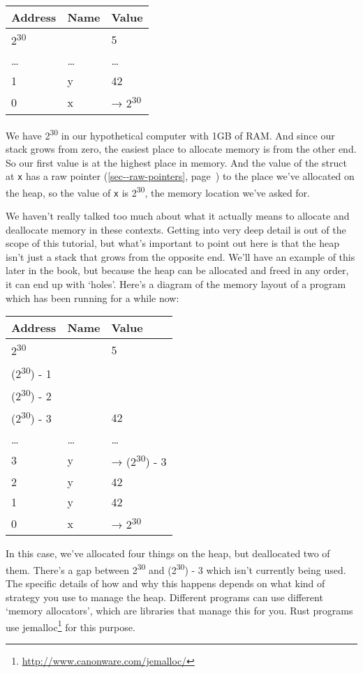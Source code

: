\documentclass[a4paper,]{book}
\renewcommand*{\hyperref}[2][\ar]{%
  \def\ar{#2}%
  #2 (\autoref{#1}, page~\pageref{#1})}
\renewcommand{\href}[2]{#2\footnote{\url{#1}}}
\begin{document}
\begin{longtable}[c]{@{}lll@{}}
\toprule
Address & Name & Value\tabularnewline
\midrule
\endhead
2\textsuperscript{30} & & 5\tabularnewline
\ldots{} & \ldots{} & \ldots{}\tabularnewline
1 & y & 42\tabularnewline
0 & x & → 2\textsuperscript{30}\tabularnewline
\bottomrule
\end{longtable}

We have 2\textsuperscript{30} in our hypothetical computer with 1GB of
RAM. And since our stack grows from zero, the easiest place to allocate
memory is from the other end. So our first value is at the highest place
in memory. And the value of the struct at \texttt{x} has a
\hyperref[sec--raw-pointers]{raw pointer} to the place we've allocated
on the heap, so the value of \texttt{x} is 2\textsuperscript{30}, the
memory location we've asked for.

We haven't really talked too much about what it actually means to
allocate and deallocate memory in these contexts. Getting into very deep
detail is out of the scope of this tutorial, but what's important to
point out here is that the heap isn't just a stack that grows from the
opposite end. We'll have an example of this later in the book, but
because the heap can be allocated and freed in any order, it can end up
with `holes'. Here's a diagram of the memory layout of a program which
has been running for a while now:

\begin{longtable}[c]{@{}lll@{}}
\toprule
Address & Name & Value\tabularnewline
\midrule
\endhead
2\textsuperscript{30} & & 5\tabularnewline
(2\textsuperscript{30}) - 1 & &\tabularnewline
(2\textsuperscript{30}) - 2 & &\tabularnewline
(2\textsuperscript{30}) - 3 & & 42\tabularnewline
\ldots{} & \ldots{} & \ldots{}\tabularnewline
3 & y & → (2\textsuperscript{30}) - 3\tabularnewline
2 & y & 42\tabularnewline
1 & y & 42\tabularnewline
0 & x & → 2\textsuperscript{30}\tabularnewline
\bottomrule
\end{longtable}

In this case, we've allocated four things on the heap, but deallocated
two of them. There's a gap between 2\textsuperscript{30} and
(2\textsuperscript{30}) - 3 which isn't currently being used. The
specific details of how and why this happens depends on what kind of
strategy you use to manage the heap. Different programs can use
different `memory allocators', which are libraries that manage this for
you. Rust programs use
\href{http://www.canonware.com/jemalloc/}{jemalloc} for this purpose.
\end{document}
